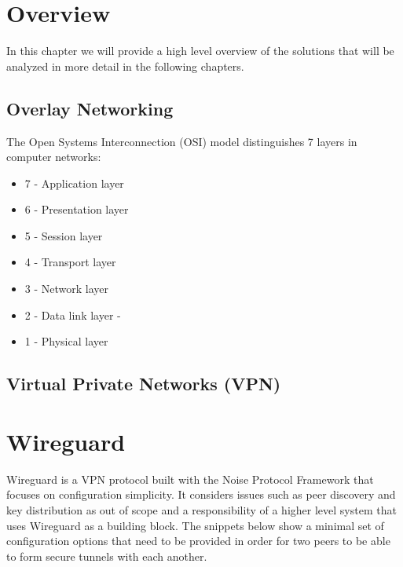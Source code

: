 \hypertarget{overview}{%
\chapter{Overview}\label{overview}}

In this chapter we will provide a high level overview of the solutions
that will be analyzed in more detail in the following chapters.

\hypertarget{overlay-networking}{%
\section{Overlay Networking}\label{overlay-networking}}

The Open Systems Interconnection (OSI) model distinguishes 7 layers in
computer networks:

\begin{itemize}
\tightlist
\item
  7 - Application layer
\item
  6 - Presentation layer
\item
  5 - Session layer
\item
  4 - Transport layer
\item
  3 - Network layer
\item
  2 - Data link layer -
\item
  1 - Physical layer
\end{itemize}

\hypertarget{virtual-private-networks-vpn}{%
\section{Virtual Private Networks
(VPN)}\label{virtual-private-networks-vpn}}

\hypertarget{wireguard}{%
\chapter{Wireguard}\label{wireguard}}

Wireguard\autocite{donenfeldWireGuardNextGeneration2017} is a VPN
protocol built with the Noise Protocol Framework\autocite{noiseProtocol}
that focuses on configuration simplicity. It considers issues such as
peer discovery and key distribution as out of scope and a responsibility
of a higher level system that uses Wireguard as a building block. The
snippets below show a minimal set of configuration options that need to
be provided in order for two peers to be able to form secure tunnels
with each another.

